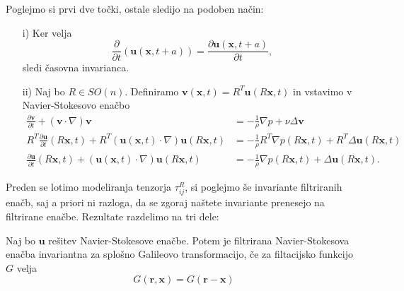 \documentclass[mat2, tisk]{fmfdelo}
\newcommand{\bd}{\textbf}
\begin{document}
\begin{dokaz}
Poglejmo si prvi dve točki, ostale sledijo na podoben način:
\begin{enumerate}
  \item[i)] Ker velja $$\frac{\partial}{\partial t} (\bd{u}(\bd{x}, t + a)) = \frac{\partial \bd{u}(\bd{x}, t + a)}{\partial t},$$ sledi časovna invarianca.
  \item[ii)] Naj bo $R\in SO(n)$. Definiramo $\bd{v}(\bd{x}, t) = R^T \bd{u}(R\bd{x}, t)$ in vstavimo v 
  Navier-Stokesovo enačbo 
  \begin{align*}
  \frac{\partial \bd{v}}{\partial t} + (\bd{v}\cdot \nabla)\bd{v} &= -\frac{1}{\rho} \nabla p + \nu \Delta \bd{v} \\
  R^T \frac{\partial \bd{u}}{\partial t}(R\bd{x}, t) + R^T (\bd{u}(\bd{x}, t)\cdot \nabla)\bd{u}(R\bd{x}, t) &= -\frac{1}{\rho} R^T \nabla p(R\bd{x}, t) + R^T \Delta \bd{u}(R\bd{x}, t) \\
  \frac{\partial \bd{u}}{\partial t}(R\bd{x}, t) + (\bd{u}(\bd{x}, t)\cdot \nabla)\bd{u}(R\bd{x}, t) &= -\frac{1}{\rho} \nabla p(R\bd{x}, t) + \Delta \bd{u}(R\bd{x}, t).
  \end{align*}
\end{enumerate}
\end{dokaz}

Preden se lotimo modeliranja tenzorja $\tau_{ij}^R$, si poglejmo še invariante filtriranih enačb, 
saj a priori ni razloga, da se zgoraj naštete invariante prenesejo na filtrirane enačbe. 
Rezultate razdelimo na tri dele:
\begin{lema}
Naj bo $\bd{u}$ rešitev Navier-Stokesove enačbe. Potem je filtrirana Navier-Stokesova enačba 
invariantna za splošno Galileovo transformacijo, če za filtacijsko funkcijo $G$ velja 
$$
G(\bd{r}, \bd{x}) = G(\bd{r} - \bd{x})
$$
\end{lema}
\end{document}
